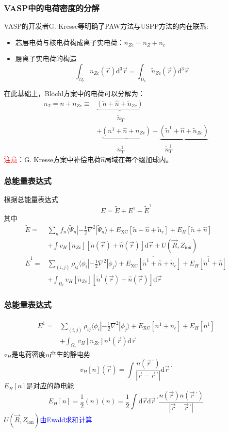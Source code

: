 \documentclass[cjk,slidestop,compress,mathserif,blue]{beamer}
\begin{document}
\frame
{
	\frametitle{\textrm{VASP}中的电荷密度的分解}
	\textrm{VASP}的开发者\textrm{G. Kresse}等明确了\textrm{PAW}方法与\textrm{USPP}方法的内在联系:
\begin{itemize}
	\item 芯层电荷与核电荷构成离子实电荷：$n_{Zc}=n_Z+n_c$
	\item 赝离子实电荷的构造$$\int_{\Omega_c}n_{Zc}(\vec r)\mathrm{d}^3\vec r=\int_{\Omega_c}\tilde n_{Zc}(\vec r)\mathrm{d}^3\vec r$$
\end{itemize}
在此基础上，\textrm{Bl\"ochl}方案中的电荷可以分解为：
\begin{displaymath}
	\begin{aligned}
		n_T=n+n_{Zc}\equiv&\underbrace{(\tilde n+\hat n+\tilde n_{Zc})}\\
				 		&\quad\qquad\tilde n_T\\
				  &+\underbrace{(n^1+\hat n+n_{Zc})}-\underbrace{(\tilde n^1+\hat n+\tilde n_{Zc})}\\
				                  &\quad\qquad n_T^1\qquad\qquad\qquad\tilde n_T^1
	\end{aligned}
\end{displaymath}
\textcolor{red}{注意}：\textrm{G. Kresse}方案中补偿电荷$\hat n$局域在每个缀加球内。
}

\frame
{
	\frametitle{总能量表达式}
	根据总能量表达式$$E=\tilde E+E^1-\tilde E^1$$其中
	\begin{displaymath}
		\begin{aligned}
			\tilde E=&\sum_nf_n\langle\tilde\Psi_n|-\frac12\nabla^2|\tilde\Psi_n\rangle+E_{\mathrm{XC}}[\tilde n+\hat n+\tilde n_c]+E_H[\tilde n+\hat n]\\
			&+\int v_H[\tilde n_{Zc}][\tilde n(\vec r)+\hat n(\vec r)]\mathrm{d}\vec r+U(\vec R,Z_{\mathrm{ion}})\\
			\tilde E^1=&\sum_{(i,j)}\rho_{ij}\langle\tilde\phi_i|-\frac12\nabla^2|\tilde\phi_j\rangle+\overline{E_{\mathrm{XC}}[\tilde n^1+\hat n+\tilde n_c]}+\overline{E_H[\tilde n^1+\hat n]}\\
			&+\int_{\Omega_r}v_H[\tilde n_{Zc}][\tilde n^1(\vec r)+\hat n(\vec r)]\mathrm{d}\vec r
		\end{aligned}
	\end{displaymath}
}

\frame
{
	\frametitle{总能量表达式}
	\begin{displaymath}
		\begin{aligned}
			E^1=&\sum_{(i,j)}\rho_{ij}\langle\phi_i|-\frac12\nabla^2|\phi_j\rangle+\overline{E_{\mathrm{XC}}[n^1+n_c]}+\overline{E_H[n^1]}\\
			&+\int_{\Omega_r}v_H[n_{Zc}]n^1(\vec r)\mathrm{d}\vec r
		\end{aligned}
	\end{displaymath}
	$v_H$是电荷密度$n$产生的静电势
	$$v_H[n](\vec r)=\int\dfrac{n(\vec r\,^{\prime})}{|\vec r-\vec r\,^{\prime}|}\mathrm{d}\vec r\,^{\prime}$$
	$E_H[n]$是对应的静电能
	$$E_H[n]=\dfrac12(n)(n)=\dfrac12\int\mathrm{d}\vec r\mathrm{d}\vec r\,^{\prime}\dfrac{n(\vec r)n(\vec r\,^{\prime})}{|\vec r-\vec r\,^{\prime}|}$$ 
	$U(\vec R,Z_{\mathrm{ion}})$\textcolor{blue}{由\textrm{Ewald}求和计算}
}
\end{document}
